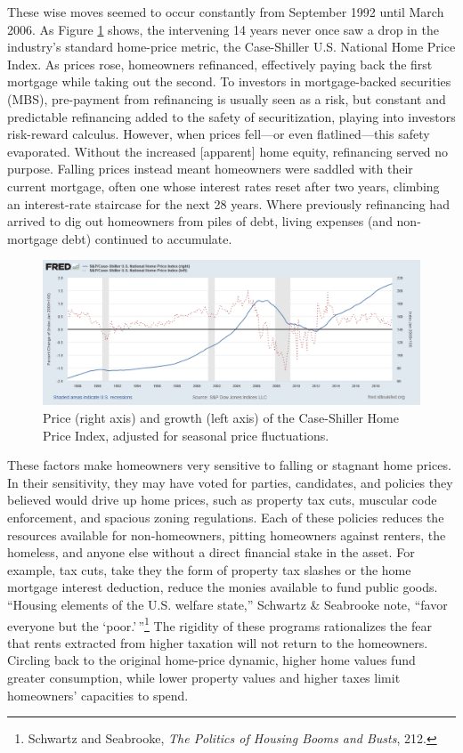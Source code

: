 \documentclass[12pt,oneside]{psthesis}
\begin{document}
These wise moves seemed to occur constantly from September 1992 until March 2006.
As Figure \ref{fig:caseshiller} shows, the intervening 14 years never once saw a drop in the industry's standard home-price metric, the Case-Shiller U.S. National Home Price Index.
As prices rose, homeowners refinanced, effectively paying back the first mortgage while taking out the second.
To investors in mortgage-backed securities (MBS), pre-payment from refinancing is usually seen as a risk, but constant and predictable refinancing added to the safety of securitization, playing into investors risk-reward calculus.
However, when prices fell---or even flatlined---this safety evaporated.
Without the increased {[}apparent{]} home equity, refinancing served no purpose.
Falling prices instead meant homeowners were saddled with their current mortgage, often one whose interest rates reset after two years, climbing an interest-rate staircase for the next 28 years.
Where previously refinancing had arrived to dig out homeowners from piles of debt, living expenses (and non-mortgage debt) continued to accumulate.
\begin{figure}

{\centering \includegraphics[width=0.9\linewidth]{figure/caseshiller_1990_2018} 

}

\caption{Price (right axis) and growth (left axis) of the Case-Shiller Home Price Index, adjusted for seasonal price fluctuations.}\label{fig:caseshiller}
\end{figure}
These factors make homeowners very sensitive to falling or stagnant home prices.
In their sensitivity, they may have voted for parties, candidates, and policies they believed would drive up home prices, such as property tax cuts, muscular code enforcement, and spacious zoning regulations.
Each of these policies reduces the resources available for non-homeowners, pitting homeowners against renters, the homeless, and anyone else without a direct financial stake in the asset.
For example, tax cuts, take they the form of property tax slashes or the home mortgage interest deduction, reduce the monies available to fund public goods.
``Housing elements of the U.S. welfare state,'' Schwartz \& Seabrooke note, ``favor everyone but the `poor.'\,''\footnote{Schwartz and Seabrooke, \emph{The Politics of Housing Booms and Busts}, 212.}
The rigidity of these programs rationalizes the fear that rents extracted from higher taxation will not return to the homeowners.
Circling back to the original home-price dynamic, higher home values fund greater consumption, while lower property values and higher taxes limit homeowners' capacities to spend.
\end{document}
